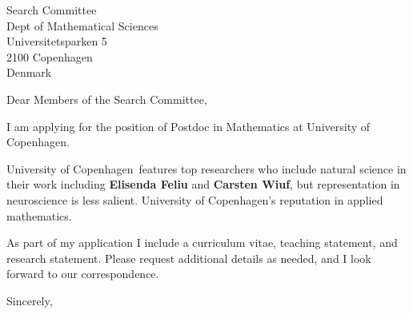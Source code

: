 \documentclass[11pt,a4paper]{letter}
\begin{document}

\def\School{University of Copenhagen}

\begin{letter}
{Search Committee\\
Dept of Mathematical Sciences\\
Universitetsparken 5\\
2100 Copenhagen\\
Denmark
}


\opening{Dear Members of the Search Committee,}

I am applying for the position of Postdoc in Mathematics at \School. 



\School~features top researchers who include natural science in their work including \textbf{Elisenda Feliu
} and \textbf{Carsten Wiuf}, but representation in neuroscience is less salient. \School's reputation in applied mathematics.



As part of my application I include a curriculum vitae, teaching statement, and research statement. Please request additional details as needed, and I look forward to our correspondence.

\closing{Sincerely,}
\end{letter}
\end{document}
